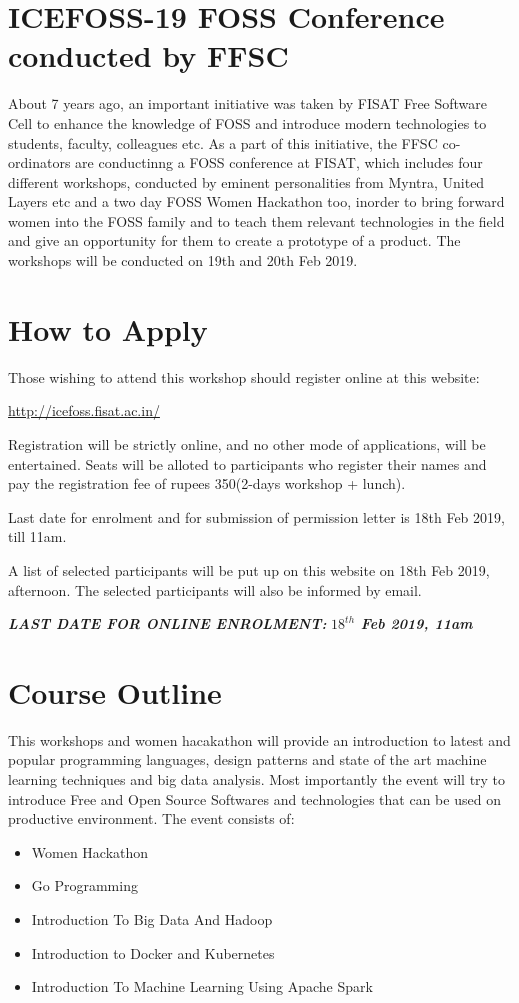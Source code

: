 \documentclass[notuble,10pt,a4paper]{leaflet}
\begin{document}
\thispagestyle{empty} 
\newpage
\section{{\Large{ICEFOSS-19 FOSS Conference conducted by FFSC}}}
About 7 years ago, an important initiative was taken by FISAT Free Software Cell to enhance the knowledge of FOSS and introduce modern technologies to students, faculty, colleagues etc. As a part of this initiative, the FFSC co-ordinators are conductinng a FOSS conference at FISAT, which includes four different workshops, conducted by eminent personalities from Myntra, United Layers etc and a two day FOSS Women Hackathon too, inorder to bring forward women into the FOSS family and to teach them relevant technologies in the field and give an opportunity for them to create a prototype of a product. The workshops will be conducted on 19th and 20th Feb 2019.
\section{{\Large How to Apply}}
Those wishing to attend this workshop should register online at this website: 

\url{http://icefoss.fisat.ac.in/}

Registration will be strictly online, and no other mode of applications, will be entertained. Seats will be alloted to participants who register their names and pay the registration fee of rupees 350(2-days workshop + lunch).

Last date for enrolment and for submission of permission letter is 18th Feb 2019, till 11am.



A list of selected participants will be put up on this website on 18th Feb 2019, afternoon. The selected participants will also be informed by email.

\emph{\textbf{LAST DATE FOR ONLINE ENROLMENT:}}
\emph{\textbf{$18^{th}$ Feb 2019, 11am}}
\newpage

\section{{\Large Course Outline}}

This workshops and women hacakathon will provide an introduction to latest and popular programming languages, design patterns and state of the art machine learning techniques and big data analysis. Most importantly the event will try to introduce Free and Open Source Softwares and technologies that can be used on productive environment. The event consists of:
\begin{itemize}
\item Women Hackathon
\item Go Programming
\item Introduction To Big Data And Hadoop
\item Introduction to Docker and Kubernetes
\item Introduction To Machine Learning Using Apache Spark
\end{itemize}
\end{document}
